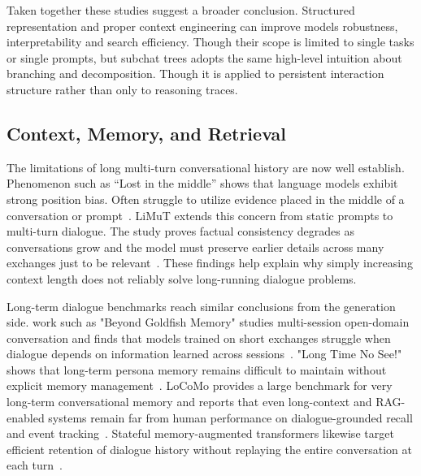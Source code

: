 \documentclass[pdflatex,sn-mathphys-num]{sn-jnl}%
\theoremstyle{thmstyleone}%
\theoremstyle{thmstyletwo}%
\theoremstyle{thmstylethree}%
\begin{document}
Taken together these studies suggest a broader conclusion. Structured representation and proper context engineering can improve models robustness, interpretability and search efficiency. Though their scope is limited to single tasks or single prompts, but subchat trees adopts the same high-level intuition about branching and decomposition. Though it is  applied to persistent interaction structure rather than only to reasoning traces.








\subsection{Context, Memory, and Retrieval}\label{subsec:memory_related}

The limitations of long multi-turn conversational history are now well establish. Phenomenon such as ``Lost in the middle'' shows that language models exhibit strong position bias. Often struggle to utilize evidence placed in the middle of a conversation or prompt~\cite{liu2023lostinthemiddle}. LiMuT extends this concern from static prompts to multi-turn dialogue. The study proves factual consistency degrades as conversations grow and the model must preserve earlier details across many exchanges just to be relevant~\cite{laban2024limt}. These findings help explain why simply increasing context length does not reliably solve long-running dialogue problems.










Long-term dialogue benchmarks reach similar conclusions from the generation side. work such as "Beyond Goldfish Memory" studies multi-session open-domain conversation and finds that models trained on short exchanges struggle when dialogue depends on information learned across sessions~\cite{xu2022goldfish}. "Long Time No See!" shows that long-term persona memory remains difficult to maintain without explicit memory management~\cite{xu2022longpersona}. LoCoMo provides a large benchmark for very long-term conversational memory and reports that even long-context and RAG-enabled systems remain far from human performance on dialogue-grounded recall and event tracking~\cite{maharana2024locomo}. Stateful memory-augmented transformers likewise target efficient retention of dialogue history without replaying the entire conversation at each turn~\cite{wu2024stateful}.
\end{document}
